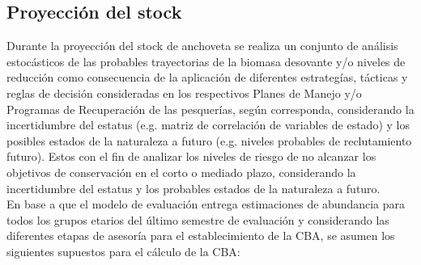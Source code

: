 \documentclass[letter,11pt]{article}
\begin{document}
\subsection{Proyecci\'on del stock}


Durante la proyecci\'on del stock de anchoveta se realiza un conjunto de 
an\'alisis estoc\'asticos de las probables trayectorias de la biomasa desovante
 y/o niveles de reducci\'on como consecuencia de la aplicaci\'on de diferentes
estrateg\'ias, t\'acticas y reglas de decisi\'on consideradas en los respectivos
Planes de Manejo y/o Programas de Recuperaci\'on de las pesquer\'ias, seg\'un
corresponda, considerando la incertidumbre del estatus (e.g. matriz de correlaci\'on
de variables de estado) y los posibles estados de la naturaleza a futuro (e.g. 
niveles probables de reclutamiento futuro). Estos con el fin de analizar los 
niveles de riesgo de no alcanzar los objetivos de conservaci\'on en el corto o
mediado plazo, considerando la incertidumbre del estatus y los probables estados
de la naturaleza a futuro.\\


En base a que el modelo de evaluaci\'on entrega estimaciones de abundancia para
todos los grupos etarios del \'ultimo semestre de evaluaci\'on y considerando 
las diferentes etapas de asesor\'ia para el establecimiento de la CBA, se asumen
los siguientes supuestos para el c\'alculo de la CBA:
\end{document}
